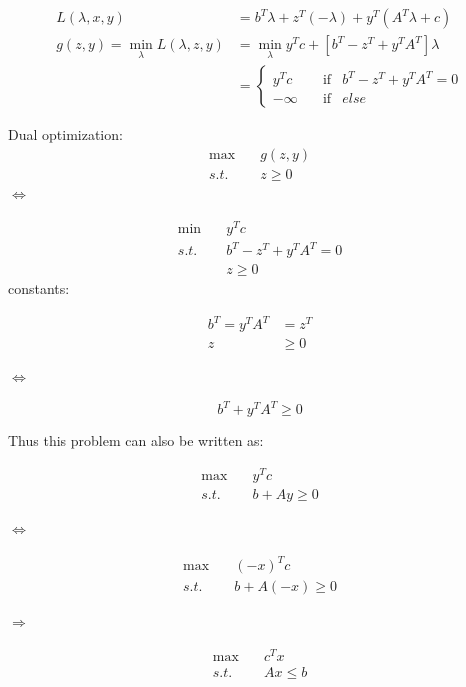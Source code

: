\begin{align*}
L(\lambda,x,y) &= b^T\lambda + z^T(-\lambda)+y^T(A^T\lambda + c)\\
g(z,y) = \min_{\lambda}L(\lambda,z,y) &= \min_{\lambda}y^Tc+[b^T-z^T+y^TA^T]\lambda\\
&=
\left\{
\begin{aligned}
y^Tc &\quad \text{if} &b^T-z^T+y^TA^T=0 \\
-\infty &\quad \text{if} &else
\end{aligned}
\right.
\end{align*}




Dual optimization:
\begin{align*}
\max\quad &g(z,y)\\
s.t.\quad &z \geq 0
\end{align*}
$\Leftrightarrow$


\begin{align*}
\min\quad &y^Tc\\
s.t.\quad &b^T-z^T+y^TA^T=0\\
&z\geq 0
\end{align*}
constants:


\begin{align*}
b^T=y^TA^T &= z^T\\
z&\geq 0
\end{align*}

$\Leftrightarrow$

\begin{equation*}
b^T+y^TA^T \geq 0
\end{equation*}

Thus this problem can also be written as:


\begin{align*}
\max\quad &y^Tc\\
s.t.\quad &b+Ay \geq 0
\end{align*}

$\Leftrightarrow$

\begin{align*}
\max\quad &(-x)^Tc\\
s.t.\quad &b+A(-x) \geq 0
\end{align*}

$\Rightarrow$

\begin{align*}
\max\quad &c^Tx\\
s.t.\quad &Ax \leq b
\end{align*}


